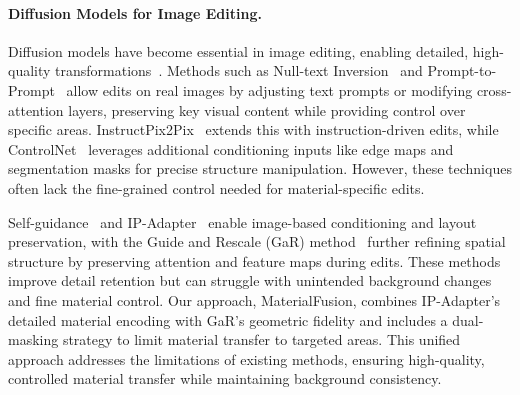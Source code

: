 


\paragraph{Diffusion Models for Image Editing.} Diffusion models have become essential in image editing, enabling detailed, high-quality transformations~\cite{ho2020denoising,dhariwal2021diffusion}. Methods such as Null-text Inversion~\cite{mokady2023null} and Prompt-to-Prompt~\cite{hertz2022prompt} allow edits on real images by adjusting text prompts or modifying cross-attention layers, preserving key visual content while providing control over specific areas. InstructPix2Pix~\cite{brooks2023instructpix2pix} extends this with instruction-driven edits, while ControlNet~\cite{zhang2023adding} leverages additional conditioning inputs like edge maps and segmentation masks for precise structure manipulation. However, these techniques often lack the fine-grained control needed for material-specific edits.

Self-guidance~\cite{epstein2023diffusion} and IP-Adapter~\cite{ye2023ipadaptertextcompatibleimage} enable image-based conditioning and layout preservation, with the Guide and Rescale (GaR) method~\cite{titov2024guideandrescaleselfguidancemechanismeffective} further refining spatial structure by preserving attention and feature maps during edits. These methods improve detail retention but can struggle with unintended background changes and fine material control. Our approach, MaterialFusion, combines IP-Adapter’s detailed material encoding with GaR’s geometric fidelity and includes a dual-masking strategy to limit material transfer to targeted areas. This unified approach addresses the limitations of existing methods, ensuring high-quality, controlled material transfer while maintaining background consistency.




